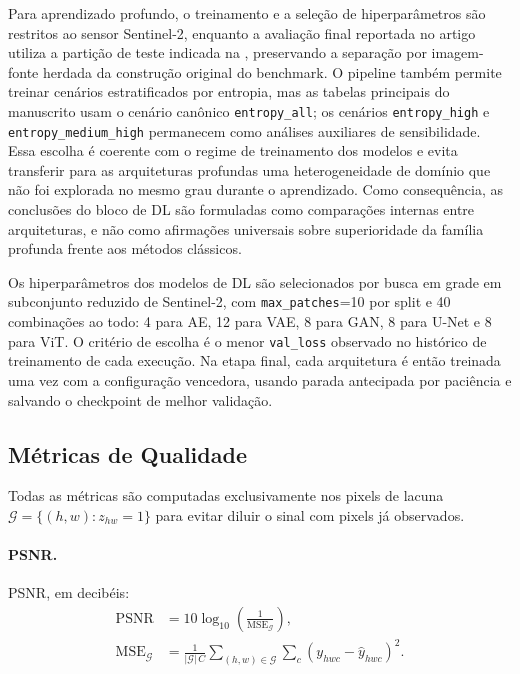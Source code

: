Para aprendizado profundo, o treinamento e a seleção de hiperparâmetros são restritos ao sensor Sentinel-2, enquanto a avaliação final reportada no artigo utiliza a partição de teste indicada na , preservando a separação por imagem-fonte herdada da construção original do benchmark.
O pipeline também permite treinar cenários estratificados por entropia, mas as tabelas principais do manuscrito usam o cenário canônico \texttt{entropy\_all}; os cenários \texttt{entropy\_high} e \texttt{entropy\_medium\_high} permanecem como análises auxiliares de sensibilidade.
Essa escolha é coerente com o regime de treinamento dos modelos e evita transferir para as arquiteturas profundas uma heterogeneidade de domínio que não foi explorada no mesmo grau durante o aprendizado.
Como consequência, as conclusões do bloco de \gls{DL} são formuladas como comparações internas entre arquiteturas, e não como afirmações universais sobre superioridade da família profunda frente aos métodos clássicos.

Os hiperparâmetros dos modelos de \gls{DL} são selecionados por busca em grade em subconjunto reduzido de Sentinel-2, com \texttt{max\_patches}=10 por split e 40 combinações ao todo: 4 para \acrshort{AE}, 12 para \acrshort{VAE}, 8 para \acrshort{GAN}, 8 para U-Net e 8 para \acrshort{ViT}.
O critério de escolha é o menor \texttt{val\_loss} observado no histórico de treinamento de cada execução.
Na etapa final, cada arquitetura é então treinada uma vez com a configuração vencedora, usando parada antecipada por paciência e salvando o checkpoint de melhor validação.

\subsection{Métricas de Qualidade}
\label{sec:metrics}

Todas as métricas são computadas exclusivamente nos pixels de lacuna $\mathcal{G} = \{(h,w) : z_{hw}=1\}$ para evitar diluir o sinal com pixels já observados.

\paragraph{PSNR.}
\gls{PSNR}, em decibéis:
\[
  \begin{aligned}
    \text{PSNR} &= 10 \log_{10}\!\left(\frac{1}{\text{MSE}_{\mathcal{G}}}\right), \\
    \text{MSE}_{\mathcal{G}} &= \frac{1}{|\mathcal{G}|\,C}
    \sum_{(h,w)\in\mathcal{G}} \sum_c (y_{hwc} - \hat{y}_{hwc})^2.
  \end{aligned}
\]

